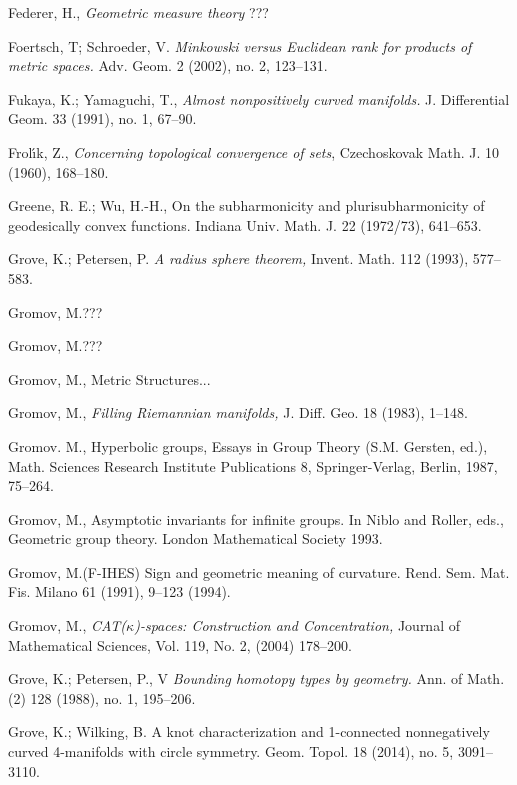 \begin{thebibliography}{52}
Federer, H., \textit{Geometric measure theory} ???

Foertsch, T;  Schroeder, V. \textit{Minkowski versus Euclidean rank for products of metric spaces.}  Adv. Geom.  2  (2002),  no. 2, 123--131.

Fukaya, K.; Yamaguchi, T., \textit{Almost nonpositively curved manifolds.}  J. Differential Geom.  33  (1991),  no. 1, 67--90.

 Frol\'{\i}k, Z., \textit{Concerning topological convergence of sets}, Czechoskovak Math. J. 10 (1960), 168--180.

 Greene, R. E.; Wu, H.-H., On the subharmonicity and plurisubharmonicity of geodesically convex
functions.
Indiana Univ. Math. J. 22 (1972/73), 641--653.

  Grove, K.; Petersen, P. \textit{A radius sphere theorem,}
Invent. Math. 112 (1993), 577--583.

Gromov, M.???

 Gromov, M.???

 Gromov, M., Metric Structures...

  Gromov, M., \textit{Filling Riemannian manifolds,} J. Diff. Geo. 18 (1983), 1--148.


Gromov. M.,
Hyperbolic groups, 
Essays in Group Theory (S.M. Gersten, ed.),
Math. Sciences Research Institute Publications 8,
Springer-Verlag, Berlin,
1987, 75--264.

Gromov, M., Asymptotic invariants for infinite groups. 
In Niblo and Roller, eds.,
Geometric group theory. London Mathematical Society 1993.

Gromov, M.(F-IHES)
Sign and geometric meaning of curvature. 
Rend. Sem. Mat. Fis. Milano 61 (1991), 9--123 (1994). 

 Gromov, M., \textit{CAT($\kappa$)-spaces: Construction and Concentration,} Journal of Mathematical Sciences, Vol. 119, No. 2, (2004) 178--200.


 Grove, K.; Petersen, P., V
\textit{Bounding homotopy types by geometry.}
Ann. of Math. (2) 128 (1988), no. 1, 195--206.

 Grove, K.; Wilking, B.
A knot characterization and 1-connected nonnegatively curved 4-manifolds with circle symmetry. 
Geom. Topol. 18 (2014), no. 5, 3091--3110.


\end{thebibliography}
